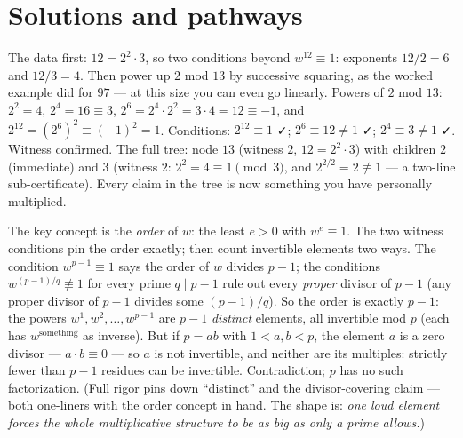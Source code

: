 \section*{Solutions and pathways}
\solutionsintro

\pathway The data first: $12 = 2^2 \cdot 3$, so two conditions beyond
$w^{12} \equiv 1$: exponents $12/2 = 6$ and $12/3 = 4$. Then power up $2$
mod $13$ by successive squaring, as the worked example did for $97$ ---
at this size you can even go linearly.
\answer Powers of $2$ mod $13$: $2^2 = 4$, $2^4 = 16 \equiv 3$,
$2^6 = 2^4 \cdot 2^2 = 3 \cdot 4 = 12 \equiv -1$, and
$2^{12} = (2^6)^2 \equiv (-1)^2 = 1$. Conditions: $2^{12} \equiv 1$ ✓;
$2^{6} \equiv 12 \neq 1$ ✓; $2^{4} \equiv 3 \neq 1$ ✓. Witness confirmed.
The full tree: node $13$ (witness $2$, $12 = 2^2 \cdot 3$) with children
$2$ (immediate) and $3$ (witness $2$: $2^2 = 4 \equiv 1 \pmod 3$, and
$2^{2/2} = 2 \not\equiv 1$ --- a two-line sub-certificate). Every claim in
the tree is now something you have personally multiplied.

\pathway The key concept is the \emph{order} of $w$: the least $e > 0$
with $w^e \equiv 1$. The two witness conditions pin the order exactly;
then count invertible elements two ways.
\answer The condition $w^{p-1} \equiv 1$ says the order of $w$ divides
$p-1$; the conditions $w^{(p-1)/q} \not\equiv 1$ for every prime
$q \mid p-1$ rule out every \emph{proper} divisor of $p-1$ (any proper
divisor of $p-1$ divides some $(p-1)/q$). So the order is exactly $p-1$:
the powers $w^1, w^2, \dots, w^{p-1}$ are $p-1$ \emph{distinct} elements,
all invertible mod $p$ (each has $w^{\text{something}}$ as inverse). But
if $p = ab$ with $1 < a, b < p$, the element $a$ is a zero divisor ---
$a \cdot b \equiv 0$ --- so $a$ is not invertible, and neither are its
multiples: strictly fewer than $p-1$ residues can be invertible.
Contradiction; $p$ has no such factorization. (Full rigor pins down
``distinct'' and the divisor-covering claim --- both one-liners with the
order concept in hand. The shape is: \emph{one loud element forces the
whole multiplicative structure to be as big as only a prime allows.})

